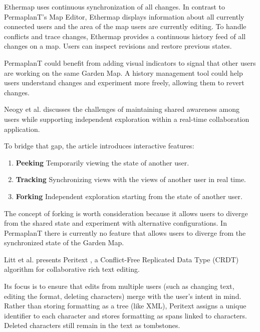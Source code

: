 \documentclass[final,oneside]{vutinfth}
\begin{document}
Ethermap uses continuous synchronization of all changes.
In contrast to PermaplanT's Map Editor, Ethermap displays information about all currently connected users and the area of the map users are currently editing.
To handle conflicts and trace changes, Ethermap provides a continuous history feed of all changes on a map.
Users can inspect revisions and restore previous states.

PermaplanT could benefit from adding visual indicators to signal that other users are working on the same Garden Map.
A history management tool could help users understand changes and experiment more freely, allowing them to revert changes.

Neogy et al. discusses the challenges of maintaining shared awareness among users while supporting independent exploration within a real-time collaboration application. \cite{collaboration_visualizations} 

To bridge that gap, the article introduces interactive features:
\begin{enumerate}
    \item \textbf{Peeking} Temporarily viewing the state of another user.
    \item \textbf{Tracking} Synchronizing views with the views of another user in real time.
    \item \textbf{Forking} Independent exploration starting from the state of another user.
\end{enumerate}

The concept of forking is worth consideration because it allows users to diverge from the shared state and experiment with alternative configurations.
In PermaplanT there is currently no feature that allows users to diverge from the synchronized state of the Garden Map.

Litt et al. presents Peritext \cite{peritext}, a Conflict-Free Replicated Data Type (CRDT) algorithm for collaborative rich text editing.

Its focus is to ensure that edits from multiple users (such as changing text, editing the format, deleting characters) merge with the user's intent in mind.
Rather than storing formatting as a tree (like XML), Peritext assigns a unique identifier to each character and stores formatting as spans linked to characters.
Deleted characters still remain in the text as tombstones.
\end{document}
